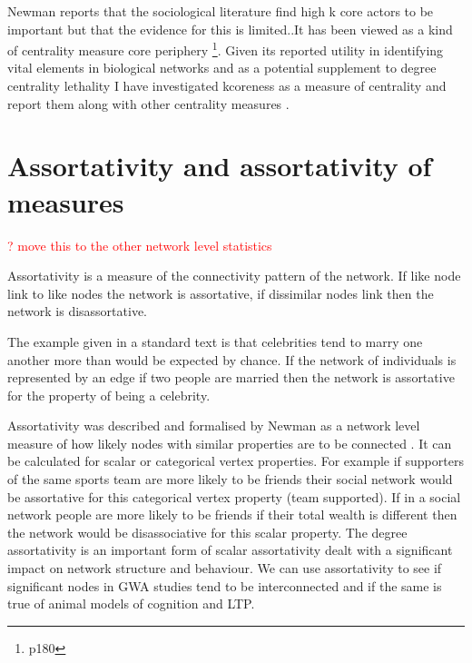 Newman reports that the sociological literature find high k core actors to be important but that the evidence for this is limited.\cite{newman2018networks}.It has been viewed as a kind of centrality measure core periphery \cite{newman2018networks}\footnote{p180}. Given its reported utility in identifying vital elements in biological networks and as a potential supplement to degree centrality lethality\cite{wuchty2005peeling} I have investigated kcoreness as a measure of centrality and report them along with other centrality measures .








\section{Assortativity and assortativity of measures}
\label{sec:assortativity}
\textcolor{red}{? move this to the other network level statistics}

Assortativity is a measure of the connectivity pattern of the network. If like node link to like nodes the network is assortative, if dissimilar nodes link then the network is disassortative. 

The example given in a standard text is that celebrities tend to marry one another more than would be expected by chance\cite{barabasi2016network}. If the network of individuals is represented by an edge if two people are married then the network is assortative for the property of being a celebrity.

Assortativity was described and formalised by Newman as a network level measure of how likely nodes with similar properties are to be connected \cite{newman2002assortative}. It can be calculated for scalar or categorical vertex properties. For example if supporters of the same sports team are more likely to be friends their social network would be assortative for this categorical vertex property (team supported). If in a social network people are more likely to be friends if their total wealth is different then the network would be disassociative for this scalar property. The degree assortativity is an important form of scalar assortativity dealt with a significant impact on network structure and behaviour. We can use assortativity to see if significant nodes in GWA studies tend to be interconnected and if the same is true of animal models of cognition and LTP. 

